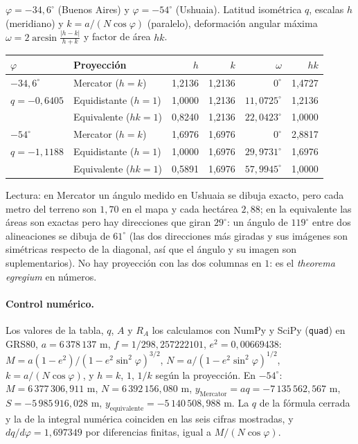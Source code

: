 \begin{resultado}
\(\varphi=-34{,}6^\circ\) (Buenos Aires) y \(\varphi=-54^\circ\) (Ushuaia). Latitud
isométrica \(q\), escalas \(h\) (meridiano) y \(k=a/(N\cos\varphi)\) (paralelo),
deformación angular máxima \(\omega=2\arcsin\frac{|h-k|}{h+k}\) y factor de área \(hk\).

{\small
\begin{center}
\begin{tabular}{l l rrrr}
\toprule
\(\varphi\) & Proyección & \(h\) & \(k\) & \(\omega\) & \(hk\)\\
\midrule
\(-34{,}6^\circ\) & Mercator (\(h=k\)) & 1{,}2136 & 1{,}2136 & \(0^\circ\) & 1{,}4727\\
\(q=-0{,}6405\) & Equidistante (\(h=1\)) & 1{,}0000 & 1{,}2136 & \(11{,}0725^\circ\) & 1{,}2136\\
 & Equivalente (\(hk=1\)) & 0{,}8240 & 1{,}2136 & \(22{,}0423^\circ\) & 1{,}0000\\
\midrule
\(-54^\circ\) & Mercator (\(h=k\)) & 1{,}6976 & 1{,}6976 & \(0^\circ\) & 2{,}8817\\
\(q=-1{,}1188\) & Equidistante (\(h=1\)) & 1{,}0000 & 1{,}6976 & \(29{,}9731^\circ\) & 1{,}6976\\
 & Equivalente (\(hk=1\)) & 0{,}5891 & 1{,}6976 & \(57{,}9945^\circ\) & 1{,}0000\\
\bottomrule
\end{tabular}
\end{center}
}

Lectura: en Mercator un ángulo medido en Ushuaia se dibuja exacto, pero cada metro del
terreno son \(1{,}70\) en el mapa y cada hectárea \(2{,}88\); en la equivalente las áreas
son exactas pero hay direcciones que giran \(29^\circ\): un ángulo de \(119^\circ\) entre dos
alineaciones se dibuja de \(61^\circ\) (las dos direcciones más giradas y sus imágenes son
simétricas respecto de la diagonal, así que el ángulo y su imagen son suplementarios). No hay
proyección con las dos columnas en \(1\): es el \emph{theorema egregium} en números.
\end{resultado}

\paragraph{Control numérico.} Los valores de la tabla, \(q\), \(A\) y \(R_A\) los
calculamos con NumPy y SciPy (\texttt{quad}) en GRS80, \(a=6\,378\,137\) m,
\(f=1/298{,}257222101\), \(e^2=0{,}00669438\): \(M=a(1-e^2)/(1-e^2\sin^2\varphi)^{3/2}\),
\(N=a/(1-e^2\sin^2\varphi)^{1/2}\), \(k=a/(N\cos\varphi)\), y \(h=k\), \(1\), \(1/k\)
según la proyección. En \(-54^\circ\): \(M=6\,377\,306{,}911\) m, \(N=6\,392\,156{,}080\) m,
\(y_{\text{Mercator}}=aq=-7\,135\,562{,}567\) m, \(S=-5\,985\,916{,}028\) m,
\(y_{\text{equivalente}}=-5\,140\,508{,}988\) m. La \(q\) de la fórmula cerrada y la de
la integral numérica coinciden en las seis cifras mostradas, y
\(dq/d\varphi=1{,}697349\) por diferencias finitas, igual a \(M/(N\cos\varphi)\).
